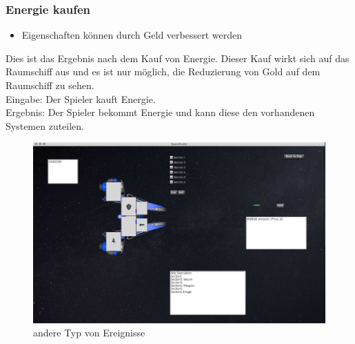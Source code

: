 \documentclass[12pt]{article}
\begin{document}
\subsubsection{Energie kaufen}
\begin{itemize}
\item Eigenschaften können durch Geld verbessert werden
\end{itemize} 
Dies ist das Ergebnis nach dem Kauf von Energie. Dieser Kauf wirkt sich auf das Raumschiff aus und es ist nur möglich, die Reduzierung von Gold auf dem Raumschiff zu sehen.\\
Eingabe: Der Spieler kauft Energie.\\
Ergebnis: Der Spieler bekommt Energie und kann diese den vorhandenen Systemen zuteilen.\\
\begin{figure}[htp]
\centering
\includegraphics[scale=0.4]{TestProtocolBilder/energie.jpg}
\caption{andere Typ von Ereignisse}
\end{figure}
\newpage
\end{document}
